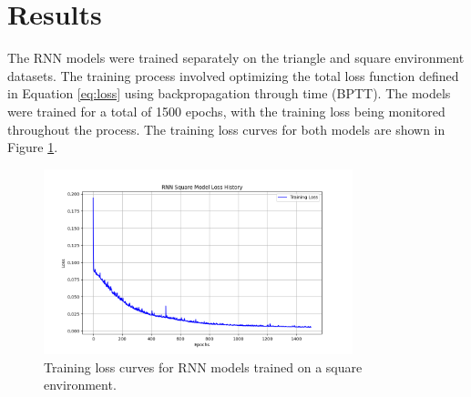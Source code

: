 \documentclass{article}
\begin{document}
\section{Results}
The RNN models were trained separately on the triangle and square environment datasets. The training process involved optimizing the total loss function defined in Equation \ref{eq:loss} using backpropagation through time (BPTT). The models were trained for a total of 1500 epochs, with the training loss being monitored throughout the process. The training loss curves for both models are shown in Figure \ref{fig:loss_curves}. 

\begin{figure}
    \centering
    \includegraphics[width=0.8\textwidth]{figures/rnn_square_model_loss_history.png}
    \caption{Training loss curves for RNN models trained on a square environment.}
    \label{fig:loss_curves}
\end{figure}
\end{document}
